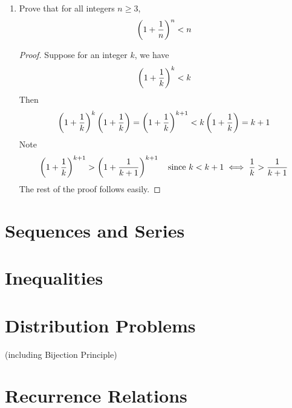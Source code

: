 \documentclass[12pt,a4 paper]{article}
\begin{document}
\begin{enumerate}
\begin{proof}
Since $P(2)$ is true and $P(k)\implies P(k+1)$, by mathematical induction $P(n)$ is true.
\end{proof}

\item Prove that for all integers $n \ge 3$, 
\[ \left(1+\frac{1}{n}\right)^n<n \]

\begin{proof}
Suppose for an integer $k$, we have 
\[ \left(1+\frac{1}{k}\right)^k<k \]
Then
\[ \left(1+\frac{1}{k}\right)^k\left(1+\frac{1}{k}\right)=\left(1+\frac{1}{k}\right)^{k+1}<k\left(1+\frac{1}{k}\right)=k+1  \]
Note 
\[ \left(1+\frac{1}{k}\right)^{k+1} > \left(1+\frac{1}{k+1}\right)^{k+1} \quad \text{since } k<k+1 \iff \frac{1}{k}>\frac{1}{k+1} \]
The rest of the proof follows easily.
\end{proof}

\end{enumerate}
\pagebreak

\section{Sequences and Series}

\pagebreak

\section{Inequalities}

\pagebreak

\section{Distribution Problems}
(including Bijection Principle)

\pagebreak

\section{Recurrence Relations}

\pagebreak
\end{document}
